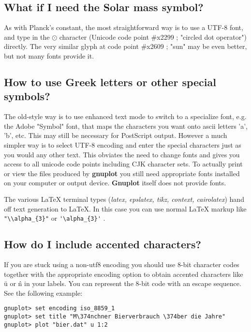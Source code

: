 \documentclass[a4paper,11pt]{article}
\newcommand{\gnuplot}{\textbf{gnuplot }}
\newcommand{\Gnuplot}{\textbf{Gnuplot }}
\begin{document}
\subsection{What if I need the Solar mass symbol?}

As with Planck's constant, the most straightforward way is to use a 
UTF-8 font, and type in the $\odot$ character (Unicode code point \#x2299 ; "circled dot operator") directly. 
The very similar glyph at code point \#x2609 ; "sun" may be even better, but not many fonts provide it.
 
\subsection{How to use Greek letters or other special symbols?}

The old-style way is to use enhanced text mode to switch to a specialize font,
e.g. the Adobe "Symbol" font, that maps the characters you want onto ascii
letters 'a', 'b', etc.  This may still be necessary for PostScript output.
However a much simpler way is to select UTF-8 encoding and enter the
special characters just as you would any other text.
This obviates the need to change fonts and gives you access to all unicode
code points including CJK character sets.  To actually print or view the
files produced by \gnuplot you still need appropriate fonts installed on
your computer or output device.  \Gnuplot itself does not provide fonts.

The various \LaTeX{} terminal types (\textit{latex, epslatex, tikz, context, cairolatex})
hand off text generation to \LaTeX{}. In this case you can use normal \LaTeX{}
markup like \verb+"\\alpha_{3}"+ or \verb+'\alpha_{3}'+ .

\subsection{How do I include accented characters?}

If you are stuck using a non-utf8 encoding you should use
8-bit character codes together with the appropriate encoding option
to obtain accented characters like \"u or \^n in your labels.
You can represent the 8-bit code with an escape sequence.
See the following example:

\small
\begin{verbatim}
gnuplot> set encoding iso_8859_1
gnuplot> set title "M\374nchner Bierverbrauch \374ber die Jahre"
gnuplot> plot "bier.dat" u 1:2
\end{verbatim}
\normalsize
\end{document}
